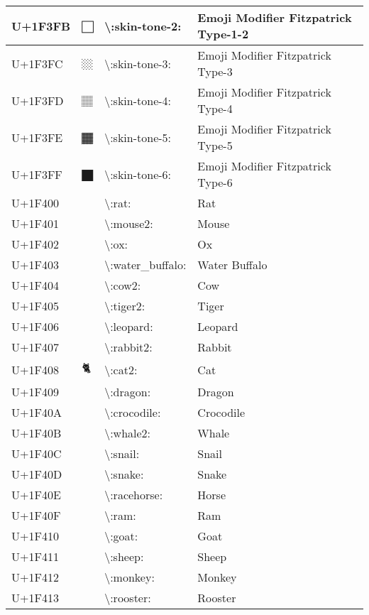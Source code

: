 \begin{table}[h]
\begin{tabulary}{\linewidth}{|L|L|L|L|}
\hline
U+1F3FB & 🏻 & {\textbackslash}:skin-tone-2: & Emoji Modifier Fitzpatrick Type-1-2 \\
\hline
U+1F3FC & 🏼 & {\textbackslash}:skin-tone-3: & Emoji Modifier Fitzpatrick Type-3 \\
\hline
U+1F3FD & 🏽 & {\textbackslash}:skin-tone-4: & Emoji Modifier Fitzpatrick Type-4 \\
\hline
U+1F3FE & 🏾 & {\textbackslash}:skin-tone-5: & Emoji Modifier Fitzpatrick Type-5 \\
\hline
U+1F3FF & 🏿 & {\textbackslash}:skin-tone-6: & Emoji Modifier Fitzpatrick Type-6 \\
\hline
U+1F400 & 🐀 & {\textbackslash}:rat: & Rat \\
\hline
U+1F401 & 🐁 & {\textbackslash}:mouse2: & Mouse \\
\hline
U+1F402 & 🐂 & {\textbackslash}:ox: & Ox \\
\hline
U+1F403 & 🐃 & {\textbackslash}:water\_buffalo: & Water Buffalo \\
\hline
U+1F404 & 🐄 & {\textbackslash}:cow2: & Cow \\
\hline
U+1F405 & 🐅 & {\textbackslash}:tiger2: & Tiger \\
\hline
U+1F406 & 🐆 & {\textbackslash}:leopard: & Leopard \\
\hline
U+1F407 & 🐇 & {\textbackslash}:rabbit2: & Rabbit \\
\hline
U+1F408 & 🐈 & {\textbackslash}:cat2: & Cat \\
\hline
U+1F409 & 🐉 & {\textbackslash}:dragon: & Dragon \\
\hline
U+1F40A & 🐊 & {\textbackslash}:crocodile: & Crocodile \\
\hline
U+1F40B & 🐋 & {\textbackslash}:whale2: & Whale \\
\hline
U+1F40C & 🐌 & {\textbackslash}:snail: & Snail \\
\hline
U+1F40D & 🐍 & {\textbackslash}:snake: & Snake \\
\hline
U+1F40E & 🐎 & {\textbackslash}:racehorse: & Horse \\
\hline
U+1F40F & 🐏 & {\textbackslash}:ram: & Ram \\
\hline
U+1F410 & 🐐 & {\textbackslash}:goat: & Goat \\
\hline
U+1F411 & 🐑 & {\textbackslash}:sheep: & Sheep \\
\hline
U+1F412 & 🐒 & {\textbackslash}:monkey: & Monkey \\
\hline
U+1F413 & 🐓 & {\textbackslash}:rooster: & Rooster \\
\hline

\end{tabulary}
\end{table}
